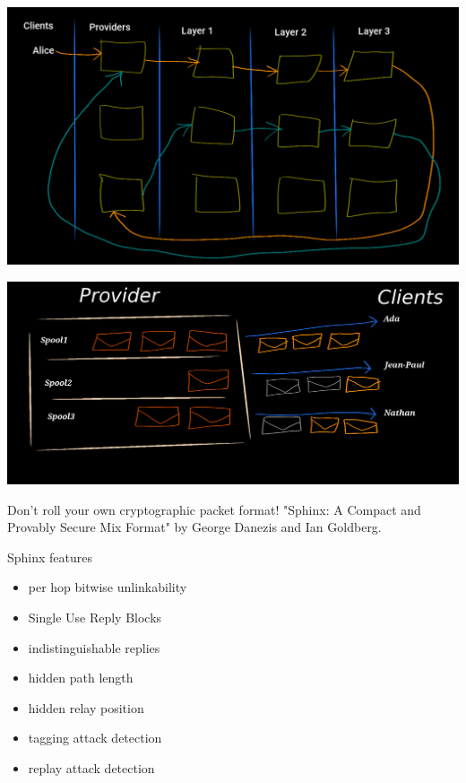 \documentclass[fleqn,xcolor={usenames,dvipsnames}]{beamer} %
\begin{document}
\begin{frame}
\begin{center}
\includegraphics[scale=.24]{pics/katzenpost_loop2}
\end{center}
\end{frame}

\begin{frame}
\begin{center}
\includegraphics[scale=.18]{pics/provider_spools}
\end{center}
\end{frame}

\begin{frame}{Don't roll your own cryptographic packet format!}
"Sphinx: A Compact and Provably Secure Mix Format"  
by George Danezis and Ian Goldberg.
\end{frame}

\begin{frame}{Sphinx features}
  \begin{itemize}
  \item per hop bitwise unlinkability
  \item Single Use Reply Blocks
  \item indistinguishable replies
  \item hidden path length
  \item hidden relay position
  \item tagging attack detection
  \item replay attack detection
  \end{itemize}    
\end{frame}
\end{document}
